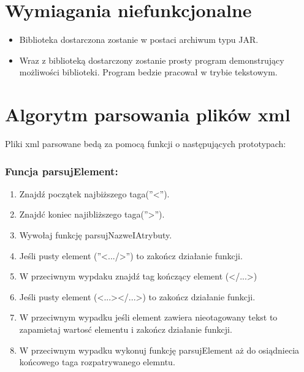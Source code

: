 \documentclass{article}
\begin{document}
\section{Wymiagania niefunkcjonalne}
\begin{itemize}
	\item Biblioteka dostarczona zostanie w postaci archiwum typu JAR.
	\item Wraz z biblioteką dostarczony zostanie prosty program demonstrujący możliwości biblioteki.
	Program bedzie pracował w trybie tekstowym.
\end{itemize}


\section{Algorytm parsowania plików xml}
Pliki xml parsowane bedą za pomocą funkcji o następujących prototypach:

\subsubsection*{Funcja parsujElement:}
\begin{enumerate}
	\item Znajdź początek najbiższego taga(''<'').
	\item Znajdć koniec najibliższego taga(''>'').
	\item Wywołaj funkcję parsujNazweIAtrybuty.
	\item Jeśli pusty element (''<.../>'') to zakończ działanie funkcji.
	\item W przeciwnym wypdaku znajdź tag kończący element (</...>)
	\item Jeśli pusty element (<...></...>) to zakończ działanie funkcji.
	\item W przeciwnym wypadku jeśli element zawiera nieotagowany tekst 
	to zapamietaj wartosć elementu i zakończ działanie funkcji.
	\item W przeciwnym wypadku wykonuj funkcję parsujElement aż do osiądniecia końcowego taga rozpatrywanego elemntu.
\end{enumerate}
\end{document}
